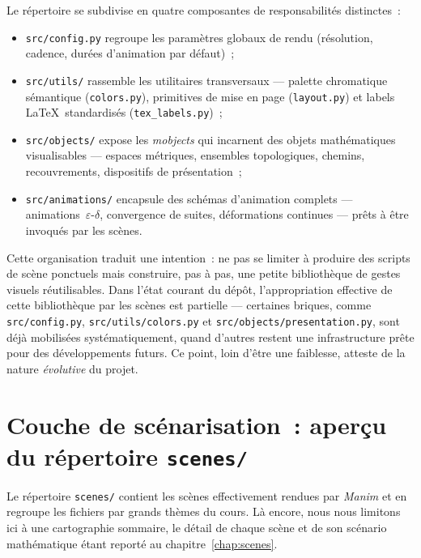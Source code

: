 \documentclass[12pt, a4paper, openany]{report}
\begin{document}
	Le répertoire se subdivise en quatre composantes de responsabilités distinctes~:

	\begin{itemize}
		\item \texttt{src/config.py} regroupe les paramètres globaux de rendu (résolution, cadence, durées d’animation par défaut)~;
		\item \texttt{src/utils/} rassemble les utilitaires transversaux — palette chromatique sémantique (\texttt{colors.py}), primitives de mise en page (\texttt{layout.py}) et labels \LaTeX\ standardisés (\texttt{tex\_labels.py})~;
		\item \texttt{src/objects/} expose les \emph{mobjects} qui incarnent des objets mathématiques visualisables — espaces métriques, ensembles topologiques, chemins, recouvrements, dispositifs de présentation~;
		\item \texttt{src/animations/} encapsule des schémas d’animation complets — animations~$\varepsilon$-$\delta$, convergence de suites, déformations continues — prêts à être invoqués par les scènes.
	\end{itemize}

	Cette organisation traduit une intention~: ne pas se limiter à produire des scripts de scène ponctuels mais construire, pas à pas, une petite bibliothèque de gestes visuels réutilisables. Dans l’état courant du dépôt, l’appropriation effective de cette bibliothèque par les scènes est partielle — certaines briques, comme \texttt{src/config.py}, \texttt{src/utils/colors.py} et \texttt{src/objects/presentation.py}, sont déjà mobilisées systématiquement, quand d’autres restent une infrastructure prête pour des développements futurs. Ce point, loin d’être une faiblesse, atteste de la nature \emph{évolutive} du projet.
	
	\section{Couche de scénarisation~: aperçu du répertoire \texttt{scenes/}}

	Le répertoire \texttt{scenes/} contient les scènes effectivement rendues par \textit{Manim} et en regroupe les fichiers par grands thèmes du cours. Là encore, nous nous limitons ici à une cartographie sommaire, le détail de chaque scène et de son scénario mathématique étant reporté au chapitre~\ref{chap:scenes}.
\end{document}
